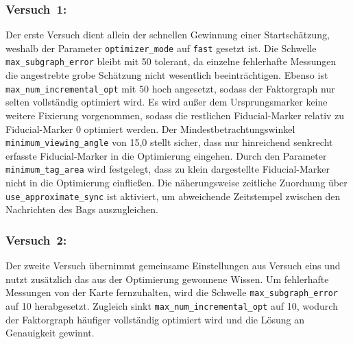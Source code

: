 \subsubsection*{Versuch~1:}
Der erste Versuch dient allein der schnellen Gewinnung einer Startschätzung, weshalb der Parameter \texttt{optimizer\_mode} auf \texttt{fast} gesetzt ist.
Die Schwelle \texttt{max\_subgraph\_error} bleibt mit 50 tolerant, da einzelne fehlerhafte Messungen die angestrebte grobe Schätzung nicht wesentlich beeinträchtigen.
Ebenso ist \texttt{max\_num\_incremental\_opt} mit 50 hoch angesetzt, sodass der Faktorgraph nur selten vollständig optimiert wird.
Es wird außer dem Ursprungsmarker keine weitere Fixierung vorgenommen, sodass die restlichen Fiducial-Marker relativ zu Fiducial-Marker 0 optimiert werden.
Der Mindestbetrachtungswinkel \texttt{minimum\_viewing\_angle} von 15,0 stellt sicher, dass nur hinreichend senkrecht erfasste Fiducial-Marker in die Optimierung eingehen.
Durch den Parameter \texttt{minimum\_tag\_area} wird festgelegt, dass zu klein dargestellte Fiducial-Marker nicht in die Optimierung einfließen.
Die näherungsweise zeitliche Zuordnung über \texttt{use\_approximate\_sync} ist aktiviert, um abweichende Zeitstempel zwischen den Nachrichten des Bags auszugleichen.



\subsubsection*{Versuch~2:}
Der zweite Versuch übernimmt gemeinsame Einstellungen aus Versuch eins und nutzt zusätzlich das aus der Optimierung gewonnene Wissen.
Um fehlerhafte Messungen von der Karte fernzuhalten, wird die Schwelle \texttt{max\_subgraph\_error} auf 10 herabgesetzt.
Zugleich sinkt \texttt{max\_num\_incremen\-tal\_opt} auf 10, wodurch der Faktorgraph häufiger vollständig optimiert wird und die Lösung an Genauigkeit gewinnt.

